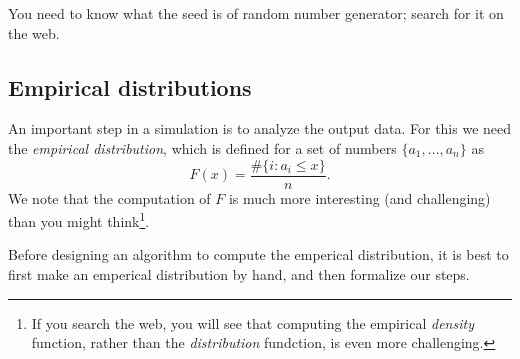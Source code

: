 You need to know what the seed is of random number generator; search for it on the web.

\subsection{Empirical distributions}
\label{sec:empir-distr}

An important step in a simulation is to analyze the output data.
For this we need the \emph{empirical distribution}, which is defined for a set of numbers $\{a_1,\ldots, a_n\}$ as
  \begin{equation}
    \label{eq:1}
    F(x) = \frac{\# \{i : a_i \leq x\}}{n}.
  \end{equation}
We note that  the computation of $F$ is much more interesting (and challenging) than you might think\footnote{If you search the web, you will see that computing the empirical \emph{density} function, rather than the \emph{distribution} fundction, is even more challenging.}.

Before designing an algorithm to compute the emperical distribution, it is best to first make an emperical distribution by hand, and then formalize our steps.

